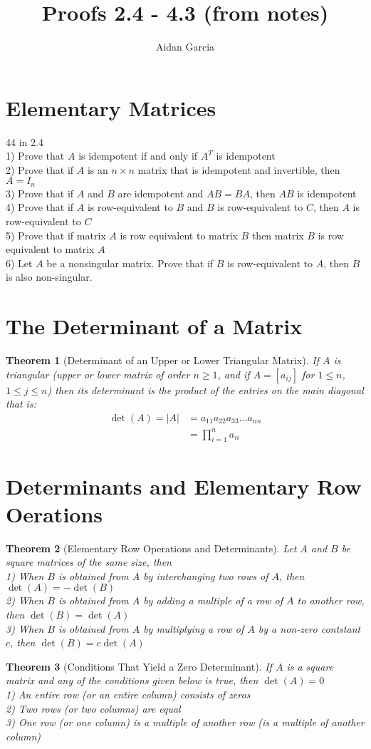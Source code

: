 \documentclass{jhwhw}
\author{Aidan Garcia}
\title{Proofs 2.4 - 4.3 (from notes)}
\newtheorem{theorem}{Theorem}
\theoremstyle{definition}
\theoremstyle{remark}
\theoremstyle{example}
\begin{document}
\section{Elementary Matrices}
44 in 2.4\\
1) Prove that \(A\) is idempotent if and only if \(A^T\) is idempotent\\
2) Prove that if \(A\) is an \(n \times n\) matrix that is idempotent and invertible, then \(A = I_n\)\\
3) Prove that if \(A\) and \(B\) are idempotent and \(AB=BA\), then \(AB\) is idempotent\\
4) Prove that if \(A\) is row-equivalent to \(B\) and \(B\) is row-equivalent to \(C\), then \(A\) is row-equivalent to \(C\)\\
5) Prove that if matrix \(A\) is row equivalent to matrix \(B\) then matrix \(B\) is row equivalent to matrix \(A\)\\
6) Let \(A\) be a nonsingular matrix. Prove that if \(B\) is row-equivalent to \(A\), then \(B\) is also non-singular. 
\section{The Determinant of a Matrix}
\begin{theorem}[Determinant of an Upper or Lower Triangular Matrix]  If \(A\) is triangular (upper or lower matrix of order \(n \geq 1\), and if \(A = [a_{ij}]\) for \(1 \leq n\), \(1 \leq j \leq n\))
    then its determinant is the product of the entries on the main diagonal that is: 
    \begin{align*} \det(A) = |A| &= a_{11} a_{22} a_{33} \ldots a_{nn}\\
    &= \prod_{i=1}^{n} a_{ii} \end{align*} \end{theorem}
\section{Determinants and Elementary Row Oerations}
\begin{theorem}[Elementary Row Operations and Determinants] Let \(A\) and \(B\) be square matrices of the same size, then\\
    1) When \(B\) is obtained from \(A\) by interchanging two rows of \(A\), then \(\det(A) = - \det(B)\)\\
    2) When \(B\) is obtained from \(A\) by adding a multiple of a row of \(A\) to another row, then \(\det(B) = \det(A)\)\\
    3) When \(B\) is obtained from \(A\) by multiplying a row of \(A\) by a non-zero contstant \(c\), then \(\det(B) = c \det(A)\) \end{theorem}
\begin{theorem}[Conditions That Yield a Zero Determinant] If \(A\) is a square matrix and any of the conditions given below is true, then \(\det(A) = 0\)\\
1) An entire row (or an entire column) consists of zeros\\
2) Two rows (or two columns) are equal\\
3) One row (or one column) is a multiple of another row (is a multiple of another column) \end{theorem}
\end{document}
